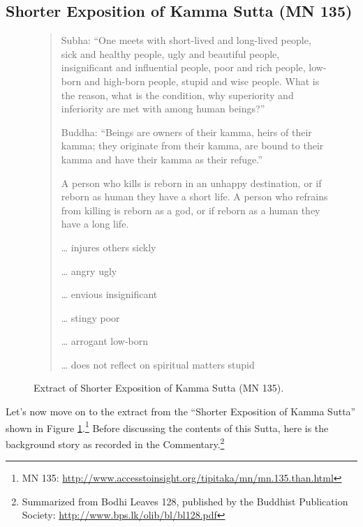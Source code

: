 \subsection*{Shorter Exposition of Kamma Sutta (MN 135)}

\begin{figure}[H]
\begin{quotation}
Subha: “One meets with short-lived and long-lived people, sick and healthy people, ugly and beautiful people, insignificant and influential people, poor and rich people, low-born and high-born people, stupid and wise people. What is the reason, what is the condition, why superiority and inferiority are met with among human beings?”

Buddha: “Beings are owners of their kamma, heirs of their kamma; they originate from their kamma, are bound to their kamma and have their kamma as their refuge.”

A person who kills is reborn in an unhappy destination, or if reborn as human they have a short life. A person who refrains from killing is reborn as a god, or if reborn as a human they have a long life.

… injures others \textrightarrow \hspace{1mm} sickly

… angry \textrightarrow \hspace{1mm} ugly

… envious \textrightarrow \hspace{1mm} insignificant

… stingy \textrightarrow \hspace{1mm} poor

… arrogant \textrightarrow \hspace{1mm} low-born

… does not reflect on spiritual matters \textrightarrow \hspace{1mm} stupid
\end{quotation}
\caption{Extract of Shorter Exposition of Kamma Sutta (MN 135).}
\label{fig:MN135}
\end{figure}

Let’s now move on to the extract from the “Shorter Exposition of Kamma Sutta” shown in Figure \ref{fig:MN135}.\footnote{MN 135: \url{http://www.accesstoinsight.org/tipitaka/mn/mn.135.than.html}} Before discussing the contents of this Sutta, here is the background story as recorded in the Commentary.\footnote{Summarized from Bodhi Leaves 128, published by the Buddhist Publication Society: \url{http://www.bps.lk/olib/bl/bl128.pdf}}

